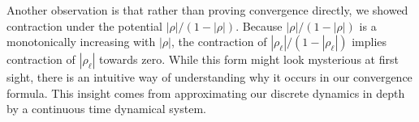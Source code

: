 \documentclass[twoside]{article}
\newcommand{\E}{\mathbb{E}}
\newtheorem{theorem}{Theorem}
\newtheorem{corollary}{Corollary}
\theoremstyle{definition}
\begin{document}
Another observation is that rather than proving convergence directly, we showed contraction under the potential $|\rho|/(1-|\rho|).$ Because $|\rho|/(1-|\rho|)$ is a monotonically increasing with $|\rho|$, the contraction of $|\rho_\ell|/(1-|\rho_\ell|)$ implies contraction of $|\rho_\ell|$ towards zero. While this form might look mysterious at first sight, there is an intuitive way of understanding why it occurs in our convergence formula. This insight comes from approximating our discrete dynamics in depth by a continuous time dynamical system. 





\end{document}
